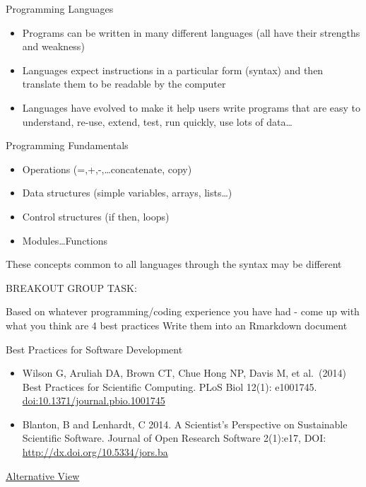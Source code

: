 \documentclass[
  ignorenonframetext,
]{beamer}
\providecommand{\tightlist}{%
  \setlength{\itemsep}{0pt}\setlength{\parskip}{0pt}}
\begin{document}
\begin{frame}{Programming Languages}
\protect\hypertarget{programming-languages}{}

\begin{itemize}
\tightlist
\item
  Programs can be written in many different languages (all have their
  strengths and weakness)
\item
  Languages expect instructions in a particular form (syntax) and then
  translate them to be readable by the computer
\item
  Languages have evolved to make it help users write programs that are
  easy to understand, re-use, extend, test, run quickly, use lots of
  data\ldots{}
\end{itemize}

\end{frame}

\begin{frame}{Programming Fundamentals}
\protect\hypertarget{programming-fundamentals}{}

\begin{itemize}
\tightlist
\item
  Operations (=,+,-,\ldots concatenate, copy)
\item
  Data structures (simple variables, arrays, lists\ldots)
\item
  Control structures (if then, loops)
\item
  Modules\ldots Functions
\end{itemize}

These concepts common to all languages through the syntax may be
different

\end{frame}

\begin{frame}{BREAKOUT GROUP TASK:}
\protect\hypertarget{breakout-group-task}{}

Based on whatever programming/coding experience you have had - come up
with what you think are 4 best practices Write them into an Rmarkdown
document

\end{frame}

\begin{frame}{Best Practices for Software Development}
\protect\hypertarget{best-practices-for-software-development}{}

\begin{itemize}
\item
  Wilson G, Aruliah DA, Brown CT, Chue Hong NP, Davis M, et al.~(2014)
  Best Practices for Scientific Computing. PLoS Biol 12(1): e1001745.
  \url{doi:10.1371/journal.pbio.1001745}
\item
  Blanton, B and Lenhardt, C 2014. A Scientist's Perspective on
  Sustainable Scientific Software. Journal of Open Research Software
  2(1):e17, DOI: \url{http://dx.doi.org/10.5334/jors.ba}
\end{itemize}

\href{http://simpleprogrammer.com/2013/02/17/principles-are-timeless-best-practices-are-fads/}{Alternative
View}

\end{frame}
\end{document}
